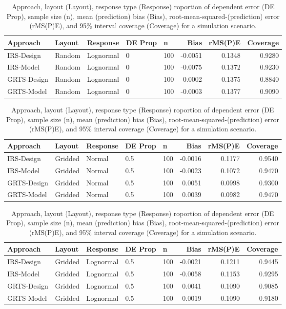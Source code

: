 \documentclass[]{elsarticle} %
\begin{document}
\begin{table}[ht]
\centering
\begin{tabular}{lllllrrr}
  \hline
Approach & Layout & Response & DE Prop & n & Bias & rMS(P)E & Coverage \\ 
  \hline
IRS-Design & Random & Lognormal & 0 & 100 & -0.0051 & 0.1348 & 0.9280 \\ 
  IRS-Model & Random & Lognormal & 0 & 100 & -0.0075 & 0.1372 & 0.9230 \\ 
  GRTS-Design & Random & Lognormal & 0 & 100 & 0.0002 & 0.1375 & 0.8840 \\ 
  GRTS-Model & Random & Lognormal & 0 & 100 & -0.0003 & 0.1377 & 0.9090 \\ 
   \hline
\end{tabular}
\caption{Approach, layout (Layout), response type (Response) roportion of dependent error (DE Prop), sample size (n), mean (prediction) bias (Bias), root-mean-squared-(prediction) error (rMS(P)E), and 95\% interval coverage (Coverage) for a simulation scenario.} 
\end{table}
\begin{table}[ht]
\centering
\begin{tabular}{lllllrrr}
  \hline
Approach & Layout & Response & DE Prop & n & Bias & rMS(P)E & Coverage \\ 
  \hline
IRS-Design & Gridded & Normal & 0.5 & 100 & -0.0016 & 0.1177 & 0.9540 \\ 
  IRS-Model & Gridded & Normal & 0.5 & 100 & -0.0023 & 0.1072 & 0.9470 \\ 
  GRTS-Design & Gridded & Normal & 0.5 & 100 & 0.0051 & 0.0998 & 0.9300 \\ 
  GRTS-Model & Gridded & Normal & 0.5 & 100 & 0.0039 & 0.0982 & 0.9470 \\ 
   \hline
\end{tabular}
\caption{Approach, layout (Layout), response type (Response) roportion of dependent error (DE Prop), sample size (n), mean (prediction) bias (Bias), root-mean-squared-(prediction) error (rMS(P)E), and 95\% interval coverage (Coverage) for a simulation scenario.} 
\end{table}
\begin{table}[ht]
\centering
\begin{tabular}{lllllrrr}
  \hline
Approach & Layout & Response & DE Prop & n & Bias & rMS(P)E & Coverage \\ 
  \hline
IRS-Design & Gridded & Lognormal & 0.5 & 100 & -0.0021 & 0.1211 & 0.9445 \\ 
  IRS-Model & Gridded & Lognormal & 0.5 & 100 & -0.0058 & 0.1153 & 0.9295 \\ 
  GRTS-Design & Gridded & Lognormal & 0.5 & 100 & 0.0041 & 0.1090 & 0.9085 \\ 
  GRTS-Model & Gridded & Lognormal & 0.5 & 100 & 0.0019 & 0.1090 & 0.9180 \\ 
   \hline
\end{tabular}
\caption{Approach, layout (Layout), response type (Response) roportion of dependent error (DE Prop), sample size (n), mean (prediction) bias (Bias), root-mean-squared-(prediction) error (rMS(P)E), and 95\% interval coverage (Coverage) for a simulation scenario.} 
\end{table}
\end{document}
